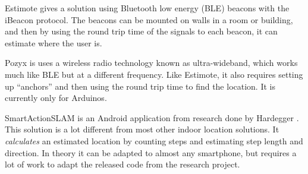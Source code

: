 Estimote gives a solution using Bluetooth low energy (BLE) beacons with the iBeacon protocol. 
The beacons can be mounted on walls in a room or building, 
and then by using the round trip time of the signals to each beacon, it can estimate where the user is. 

Pozyx is uses a wireless radio technology known as ultra-wideband, which works much like BLE but at a different frequency. 
Like Estimote, it also requires setting up ``anchors'' and then using the round trip time to find the location. 
It is currently only for Arduinos. 

SmartActionSLAM is an Android application from research done by Hardegger \etal \cite{SASLAM}. 
This solution is a lot different from most other indoor location solutions. 
It \emph{calculates} an estimated location by counting steps and estimating step length and direction. 
In theory it can be adapted to almost any smartphone, 
but requires a lot of work to adapt the released code from the research project. 